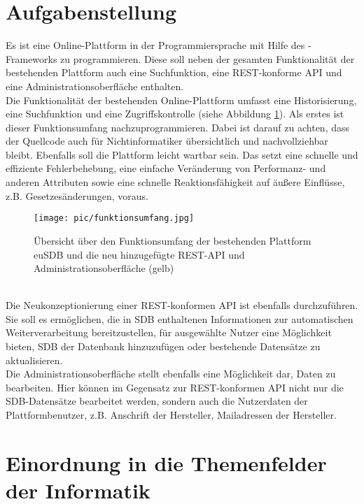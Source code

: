 \section{Aufgabenstellung}
\label{aufgabenstellung}

Es ist eine Online-Plattform in der Programmiersprache  mit Hilfe
des -Frameworks zu programmieren.
Diese soll neben der gesamten Funktionalität der bestehenden Plattform
 auch eine Suchfunktion, eine \ac{REST}-konforme \ac{API} und eine
Administrationsoberfläche enthalten.
\\
Die Funktionalität der bestehenden Online-Plattform umfasst eine Historisierung,
eine Suchfunktion und eine Zugriffskontrolle (siehe Abbildung
\ref{fig:funktionsumfang}). Als erstes ist dieser Funktionsumfang
nachzuprogrammieren. Dabei ist darauf zu achten, dass der Quellcode auch für
Nichtinformatiker übersichtlich und nachvollziehbar bleibt. Ebenfalls soll die
Plattform leicht wartbar sein. Das setzt eine schnelle und effiziente
Fehlerbehebung, eine einfache Veränderung von Performanz- und anderen Attributen
sowie eine schnelle Reaktionsfähigkeit auf äußere Einflüsse, z.B.
Gesetzesänderungen, voraus.
\begin{figure}[ht]
  \centering
    \texttt{[image: pic/funktionsumfang.jpg]}
      \caption[Funktionsumfang der Plattform euSDB]{Übersicht über den
      Funktionsumfang der bestehenden Plattform euSDB und die neu hinzugefügte REST-API und
      Administrationsoberfläche (gelb)}
      \label{fig:funktionsumfang}
\end{figure}
\\
Die Neukonzeptionierung einer \ac{REST}-konformen \ac{API} ist ebenfalls
durchzuführen. Sie soll es ermöglichen, die in \ac{SDB} enthaltenen
Informationen zur automatischen Weiterverarbeitung bereitzustellen, für ausgewählte
Nutzer eine Möglichkeit bieten, \ac{SDB} der Datenbank
hinzuzufügen oder bestehende Datensätze zu aktualisieren.
\\
Die Administrationsoberfläche stellt ebenfalls eine Möglichkeit dar, Daten zu
bearbeiten. Hier können im Gegensatz zur \ac{REST}-konformen \ac{API} nicht nur die
\ac{SDB}-Datensätze bearbeitet werden, sondern auch die Nutzerdaten der
Plattformbenutzer, z.B. Anschrift der Hersteller, Mailadressen der Hersteller.

\section{Einordnung in die Themenfelder der Informatik}
\label{sec:einordnung}

